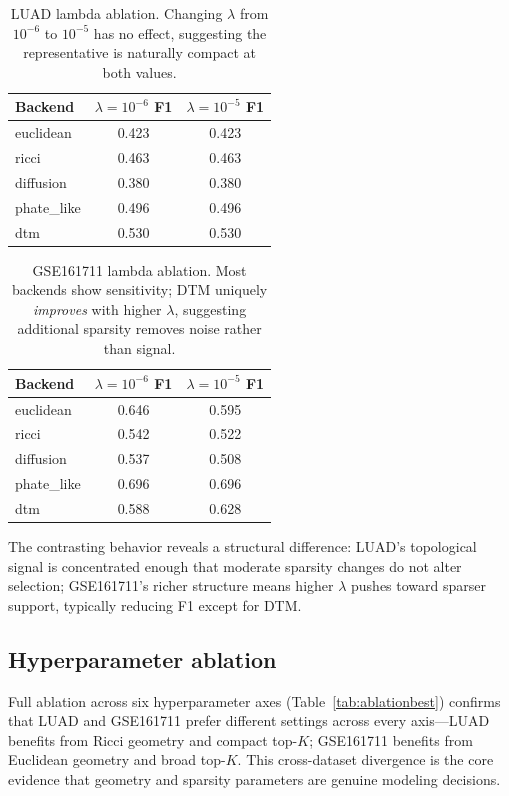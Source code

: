\documentclass[12pt]{article}
\begin{document}
\begin{table}[h]
\centering
\small
\begin{tabular}{lcc}
\toprule
Backend & $\lambda = 10^{-6}$ F1 & $\lambda = 10^{-5}$ F1 \\
\midrule
euclidean & 0.423 & 0.423 \\
ricci & 0.463 & 0.463 \\
diffusion & 0.380 & 0.380 \\
phate\_like & 0.496 & 0.496 \\
dtm & 0.530 & 0.530 \\
\bottomrule
\end{tabular}
\caption{LUAD lambda ablation. Changing $\lambda$ from $10^{-6}$ to $10^{-5}$ has no effect, suggesting the representative is naturally compact at both values.}
\label{tab:lambda_luad}
\end{table}

\begin{table}[h]
\centering
\small
\begin{tabular}{lcc}
\toprule
Backend & $\lambda = 10^{-6}$ F1 & $\lambda = 10^{-5}$ F1 \\
\midrule
euclidean & 0.646 & 0.595 \\
ricci & 0.542 & 0.522 \\
diffusion & 0.537 & 0.508 \\
phate\_like & 0.696 & 0.696 \\
dtm & 0.588 & 0.628 \\
\bottomrule
\end{tabular}
\caption{GSE161711 lambda ablation. Most backends show sensitivity; DTM uniquely \emph{improves} with higher $\lambda$, suggesting additional sparsity removes noise rather than signal.}
\label{tab:lambda_gse}
\end{table}

The contrasting behavior reveals a structural difference: LUAD's topological signal is concentrated enough that moderate sparsity changes do not alter selection; GSE161711's richer structure means higher $\lambda$ pushes toward sparser support, typically reducing F1 except for DTM.

\subsection{Hyperparameter ablation}
\label{sec:ablation}

Full ablation across six hyperparameter axes (Table~\ref{tab:ablationbest}) confirms that LUAD and GSE161711 prefer different settings across every axis---LUAD benefits from Ricci geometry and compact top-$K$; GSE161711 benefits from Euclidean geometry and broad top-$K$.
This cross-dataset divergence is the core evidence that geometry and sparsity parameters are genuine modeling decisions.
\end{document}
